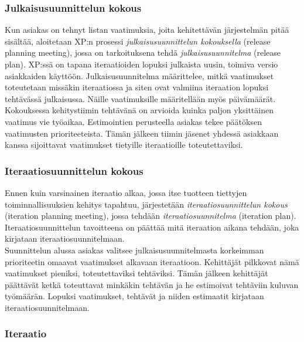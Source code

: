 \documentclass[finnish]{../tktltiki2}
\theoremstyle{definition}
\theoremstyle{remark}
\begin{document}
\subsubsection{Julkaisusuunnittelun kokous}

Kun asiakas on tehnyt listan vaatimuksia, joita kehitettävän järjestelmän pitää sisältää, aloitetaan XP:n prosessi \emph{julkaisusuunnittelun kokouksella} (release planning meeting),
jossa on tarkoituksena tehdä \emph{julkaisusuunnitelma} (release plan). XP:ssä on tapana iteraatioiden lopuksi julkaista uusin, toimiva versio asiakkaiden käyttöön. Julkaisusuunnitelma määrittelee, mitkä vaatimukset toteutetaan missäkin iteraatiossa ja siten ovat valmiina iteraation lopuksi tehtävässä julkaisussa. Näille vaatimuksille määritellään myös päivämäärät.\\

Kokouksessa kehitystiimin tehtävänä on arvioida kuinka paljon yksittäinen vaatimus vie työaikaa. Estimointien perusteella asiakas
tekee päätök\-sen vaatimusten prioriteeteista. Tämän jälkeen tiimin jäsenet
yhdessä asiakkaan kanssa sijoittavat vaatimukset tietyille iteraatioille toteutettaviksi.

\subsubsection{Iteraatiosuunnittelun kokous}

Ennen kuin varsinainen iteraatio alkaa, jossa itse tuotteen tiettyjen toiminnallisuuksien
kehitys tapahtuu, järjestetään \emph{iteraatiosuunnittelun kokous} (iteration planning meeting), jossa tehdään \emph{iteraatiosuunnitelma} (iteration plan). Iteraatiosuunnittelun tavoitteena on päättää mitä iteraation aikana tehdään, joka kirjataan iteraatiosuunnitelmaan.\\

Suunnittelun alussa asiakas valitsee julkaisusuunnitelmasta korkeimman prioriteetin omaavat vaatimukset alkavaan iteraatioon. Kehittäjät pilkkovat nämä vaatimukset pieniksi, toteutettaviksi tehtäviksi. Tämän jälkeen kehittäjät päättävät ketkä toteuttavat minkäkin tehtävän ja he estimoivat tehtäviin kuluvan työmäärän. Lopuksi vaatimukset, tehtävät ja niiden estimaatit kirjataan iteraatiosuunnitelmaan.

\subsubsection{Iteraatio}
\end{document}
